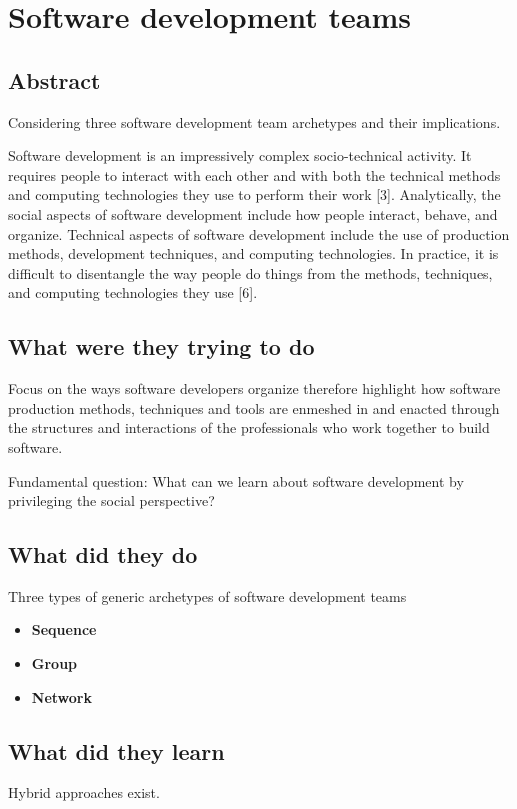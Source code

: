 \section{Software development teams}

\subsection{Abstract}

Considering three software development team archetypes and their implications.

Software development is an impressively complex
socio-technical activity. It requires people to
interact with each other and with both the
technical methods and computing technologies
they use to perform their work [3]. Analytically,
the social aspects of software development
include how people interact, behave, and organize.
Technical aspects of software development include
the use of production methods, development
techniques, and computing technologies. In
practice, it is difficult to disentangle the way
people do things from the methods, techniques,
and computing technologies they use [6].

\subsection{What were they trying to do}

Focus on the ways software developers organize therefore highlight how software production methods, techniques and tools are enmeshed in and enacted through the structures and interactions of the professionals who work together to build software.

Fundamental question: What can we learn about software development by privileging the social perspective?

\subsection{What did they do}

Three types of generic archetypes of software development teams

\begin{itemize}
    \item \textbf{Sequence}
    \item \textbf{Group}
    \item \textbf{Network}
\end{itemize}

\subsection{What did they learn}

Hybrid approaches exist.
